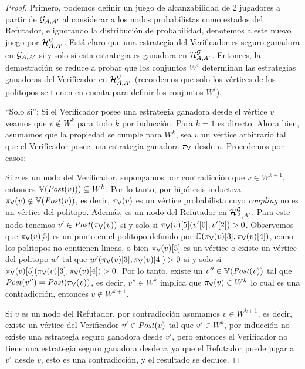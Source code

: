 \begin{proof} Primero, podemos definir un juego de alcanzabilidad de $2$ jugadores a partir de  $\StochG_{A,A'}$ al considerar a los nodos probabilistas como estados del Refutador, e ignorando la distribución de probabilidad, denotemos a este nuevo juego por $\mathcal{H}^\StochG_{A,A'}$. 
Está claro que una estrategia del Verificador es seguro ganadora en $\StochG_{A,A'}$ si y solo si esta estrategia es ganadora en $\mathcal{H}^\StochG_{A,A'}$. 
Entonces, la demostración se reduce a probar que los conjuntos $W^i$ determinan las estrategias ganadoras del Verificador en $\mathcal{H}^\StochG_{A, A'}$ (recordemos que solo los vértices de los politopos se tienen en cuenta para definir los conjuntos $W^i$). 

``Solo si'': Si el Verificador posee una estrategia ganadora desde el vértice $v$ veamos que $v \notin W^k$ para todo $k$ por inducción. 
Para $k=1$ es directo. Ahora bien, asumamos que la propiedad se cumple para $W^k$, sea $v$ un vértice arbitrario tal que el Verificador posee una estrategia ganadora $\strat{\Verifier}$ desde $v$.  Procedemos por casos:

Si $v$ es un nodo del Verificador, supongamos por contradicción que $v \in W^{k+1}$, entonces $\vertices{\post(v))}  \subseteq W^k$. 
Por lo tanto, por hipótesis inductiva $\strat{\Verifier}(v) \notin \vertices{\post(v)}$, es decir, $\strat{\Verifier}(v)$ es un vértice probabilista cuyo \emph{coupling} no es un vértice del politopo. Además, es un nodo del Refutador en $\mathcal{H}^\StochG_{A,A'}$. Para este nodo tenemos $v' \in \post(\strat{\Verifier}(v))$ si y solo si $\pr{5}{\strat{\Verifier}(v)}(\pr{0}{v'}, \pr{2}{v'})>0$. 
Observemos que $\pr{5}{\strat{\Verifier}(v)}$ es un punto en el politopo definido por $\couplings{\pr{3}{\strat{\Verifier}(v)}}{\pr{4}{\strat{\Verifier}(v)}}$, 
como los politopos no contienen lineas, o bien $\pr{5}{\strat{\Verifier}(v)}$ es un vértice o existe un vértice del politopo $w'$ tal que   $w'(\pr{3}{\strat{\Verifier}(v)}, \pr{4}{\strat{\Verifier}(v)})>0$ si y solo si $\pr{5}{\strat{\Verifier}(v)}(\pr{3}{\strat{\Verifier}(v)}, \pr{4}{\strat{\Verifier}(v)})>0$. 
Por lo tanto, existe un $v'' \in \vertices{\post(v)}$ tal que $\post(v'') = \post(\strat{\Verifier}(v))$, es decir, $v'' \in W^k$ implica que $\strat{\Verifier}(v) \in W^{k}$ lo cual es una contradicción, entonces $v \notin W^{k+1}$. 

Si $v$ es un nodo del Refutador, por contradicción asumamos $v \in W^{k+1}$, es decir, existe un vértice del Verificador $v' \in \post(v)$ tal que 
$v' \in W^k$, por inducción no existe una estrategia seguro ganadora desde $v'$, pero entonces el Verificador no tiene una estrategia seguro ganadora desde $v$, ya que
el Refutador puede jugar a $v'$ desde $v$, esto es una contradicción, y el resultado se deduce.


\end{proof}
